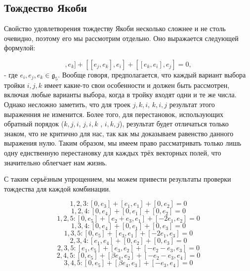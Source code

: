 \documentclass[a4paper]{article}
\begin{document}
\subsection{Тождество Якоби}
Свойство удовлетворения тождеству Якоби несколько сложнее и не столь очевидно, поэтому его мы рассмотрим отдельно. Оно выражается следующей формулой:

\begin{equation*}
[[e_{i}, e_{j}], e_{k}] + [[e_{j}, e_{k}], e_{i}] + [[e_{k}, e_{i}], e_{j}] = 0,
\end{equation*}
 - где $e_{i}, e_{j}, e_{k} \in \mathfrak{g}_{5}$. Вообще говоря, предполагается, что каждый вариант выбора тройки $i,j,k$ имеет какие-то свои особенности и должен быть рассмотрен, включая любые варианты выбора, когда в тройку входят одни и те же числа. Однако несложно заметить, что для троек $j,k,i$, $k,i,j$ результат этого выраженния не изменится. Более того, для перестановок, использующих обратный порядок ($k,j,i$,  $j,i,k$ , $i,k,j$), результат будет отличаться только знаком, что не критично для нас, так как мы доказываем равенство данного выражения нулю. Таким образом, мы имеем право рассматривать только лишь одну еднственную перестановку для каждых трёх векторных полей, что значительно облегчает нам жизнь.

С таким серьёзным упрощением, мы можем привести результаты проверки тождества для каждой комбинации.

\begin{equation*}
1,2,3: [0, e_{3}] + [e_{1}, e_{1}] + [0, e_{2}] = 0
\end{equation*}
\begin{equation*}
1,2,4: [0, e_{4}] + [0, e_{1}] + [0, e_{2}] = 0
\end{equation*}
\begin{equation*}
1,2,5: [0, e_{5}] + [e_{2}+e_{3}, e_{1}] + [-2e_{1}, e_{2}] = 0
\end{equation*}
\begin{equation*}
1,3,4: [0, e_{4}] + [0, e_{1}] + [0, e_{3}] = 0
\end{equation*}
\begin{equation*}
1,3,5: [0, e_{5}] + [e_{3}, e_{1}] + [-2e_{1}, e_{3}] = 0
\end{equation*}
\begin{equation*}
2,3,4: [e_{1}, e_{4}] + [0, e_{2}] + [0, e_{3}] = 0
\end{equation*}
\begin{equation*}
2,3,5: [e_{1}, e_{5}] + [e_{3}, e_{2}] + [-e_{2}-e_{3}, e_{3}] = 0
\end{equation*}
\begin{equation*}
2,4,5: [0, e_{5}] + [\beta e_{4}, e_{2}] + [-e_{2}-e_{3}, e_{4}] = 0
\end{equation*}
\begin{equation*}
3,4,5: [0, e_{5}] + [\beta e_{4}, e_{3}] + [-e_{3}, e_{4}] = 0
\end{equation*}
\end{document}
